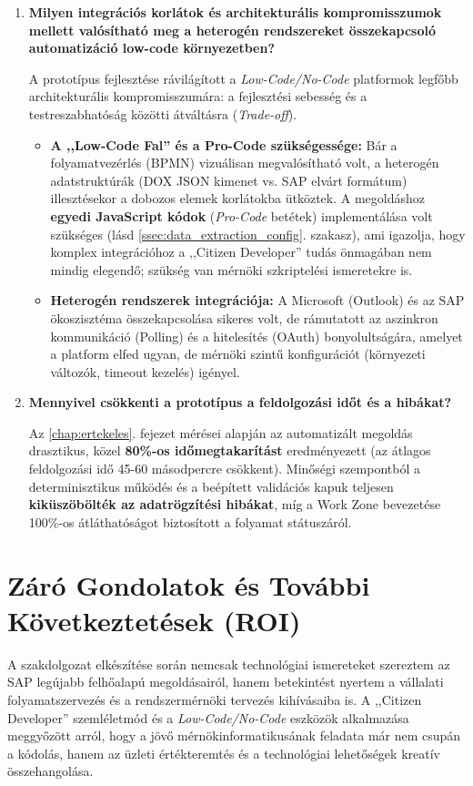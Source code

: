 \begin{enumerate}
    \item \textbf{Milyen integrációs korlátok és architekturális kompromisszumok mellett valósítható meg a heterogén rendszereket összekapcsoló automatizáció low-code környezetben?}
    
    A prototípus fejlesztése rávilágított a \textit{Low-Code/No-Code} platformok legfőbb architekturális kompromisszumára: a fejlesztési sebesség és a testreszabhatóság közötti átváltásra (\textit{Trade-off}).
    \begin{itemize}
        \item \textbf{A ,,Low-Code Fal'' és a Pro-Code szükségessége:} Bár a folyamatvezérlés (BPMN) vizuálisan megvalósítható volt, a heterogén adatstruktúrák (DOX JSON kimenet vs. SAP elvárt formátum) illesztésekor a dobozos elemek korlátokba ütköztek. A megoldáshoz \textbf{egyedi JavaScript kódok} (\textit{Pro-Code} betétek) implementálása volt szükséges (lásd \ref{ssec:data_extraction_config}. szakasz), ami igazolja, hogy komplex integrációhoz a ,,Citizen Developer'' tudás önmagában nem mindig elegendő; szükség van mérnöki szkriptelési ismeretekre is.
        \item \textbf{Heterogén rendszerek integrációja:} A Microsoft (Outlook) és az SAP ökoszisztéma összekapcsolása sikeres volt, de rámutatott az aszinkron kommunikáció (Polling) és a hitelesítés (OAuth) bonyolultságára, amelyet a platform elfed ugyan, de mérnöki szintű konfigurációt (környezeti változók, timeout kezelés) igényel.
    \end{itemize}

    \item \textbf{Mennyivel csökkenti a prototípus a feldolgozási időt és a hibákat?}
    
    Az \ref{chap:ertekeles}. fejezet mérései alapján az automatizált megoldás drasztikus, közel \textbf{80\%-os időmegtakarítást} eredményezett (az átlagos feldolgozási idő 45-60 másodpercre csökkent). Minőségi szempontból a determinisztikus működés és a beépített validációs kapuk teljesen \textbf{kiküszöbölték az adatrögzítési hibákat}, míg a Work Zone bevezetése 100\%-os átláthatóságot biztosított a folyamat státuszáról.
\end{enumerate}

\section{Záró Gondolatok és További Következtetések (ROI)}
\label{sec:conclusion_roi}

A szakdolgozat elkészítése során nemcsak technológiai ismereteket szereztem az SAP legújabb felhőalapú megoldásairól, hanem betekintést nyertem a vállalati folyamatszervezés és a rendszermérnöki tervezés kihívásaiba is. A ,,Citizen Developer'' szemléletmód és a \textit{Low-Code/No-Code} eszközök alkalmazása meggyőzött arról, hogy a jövő mérnökinformatikusának feladata már nem csupán a kódolás, hanem az üzleti értékteremtés és a technológiai lehetőségek kreatív összehangolása.

